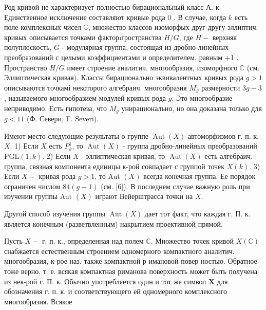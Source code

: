 \documentclass[10pt]{article}
\begin{document}
Род кривой не характеризует полностью бирациональный класс А. к. Единственное исключение составляют кривые рода 0 . В случае, когда $k$ есть поле комплексных чисел $\mathbb{C}$, множество классов изоморфых друг другу эллиптич. кривых описывается точками факторıгространства $H / G$, где $H-$ верхняя полуплоскость, $G$ - модулярная группа, состоящая из дробно-линейных преобразований с целыми коэффициентами и определителем, равным +1 . Пространство $H / G$ имеет строение аналитич. многообразия, изоморфного $\mathbb{C}$ (см. Эллиптическая кривая). Классы бирационально эквивалентных кривых рода $g>1$ описываются точкамі некоторого алгебраич. многообразия $M_{g}$ размерности $3 g-3$, называемого многообразием модулей кривых рода $g$. Это многообразие неприводимо. Есть гипотеза, что $M_{g}$ унирационально, но она доказана только для $g<11$ (Ф. Севери, F. Severi).



Имеют место следующие результаты о группе $\operatorname{Aut}(X)$ автоморфизмов г. п. к. $X$. 1) Если $X$ есть $P_{k}^{1}$, то $\operatorname{Aut}(X)$ - группа дробно-линейных преобразований $\mathrm{PGL}(1, k)$. 2) Если $X$ - эллиптическая кривая, то $\operatorname{Aut}(X)$ есть алгебраич. группа, связная компонента единицы к-рой совпадает с группой точек $X(k)$. 3) Если $X-$ кривая рода $g>1$, то Aut $(X)$ всегда конечная группа. Ее порядок ограничен числом $84(g-1)$ (см. [6]). В последнем случае важную роль при изучении группы Aut $(X)$ играют Вейерштрасса точки на $X$.



Другой способ изучения группы $\operatorname{Aut}(X)$ дает тот факт, что каждая г. П. к. является конечным (разветвленным) накрытием проективной прямой.



Пусть $X-$ г. п. к., определенная над полем $\mathbb{C}$. Множество точек кривой $X(\mathbb{C})$ снабжается естественным строением одномерного компактного аналитич. многообразия, к-рое наз. также компактной $р$ имановой повер ностью. Обратное тоже верно, т. е. всякая компактная риманова поверхность может быть получена из нек-рой г. П. к. Обычно употребляется один и тот же символ $\boldsymbol{X}$ для обозначения г. п. к. и соответствующего ей одномерного комплексного многообразия. Всякое
\end{document}
